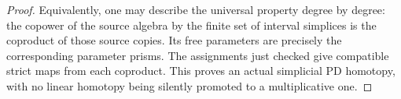 \begin{proof}
Equivalently, one may describe the universal
property degree by degree: the copower of
the source algebra by the finite set of
interval simplices is the coproduct of
those source copies. Its free parameters
are precisely the corresponding parameter
prisms. The assignments just checked give
compatible strict maps from each coproduct.
This proves an actual simplicial PD
homotopy, with no linear homotopy being
silently promoted to a multiplicative one.
\end{proof}

